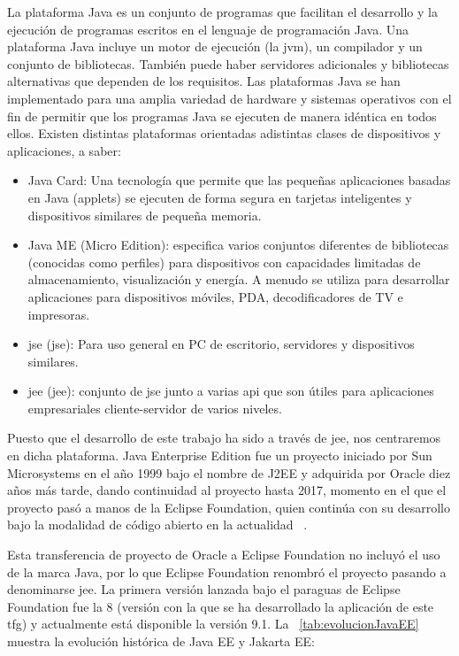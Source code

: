 La plataforma Java es un conjunto de programas que facilitan el desarrollo y la ejecución de programas escritos en el lenguaje de programación Java. Una plataforma Java incluye un motor de ejecución (la \acrshort{jvm}), un compilador y un conjunto de bibliotecas. También puede haber servidores adicionales y bibliotecas alternativas que dependen de los requisitos. Las plataformas Java se han implementado para una amplia variedad de hardware y sistemas operativos con el fin de permitir que los programas Java se ejecuten de manera idéntica en todos ellos. Existen distintas plataformas orientadas adistintas clases de dispositivos y aplicaciones, a saber:
\begin{itemize}
\item Java Card: Una tecnología que permite que las pequeñas aplicaciones basadas en Java (applets) se ejecuten de forma segura en tarjetas inteligentes y dispositivos similares de pequeña memoria. 
\item Java ME (Micro Edition): especifica varios conjuntos diferentes de bibliotecas (conocidas como perfiles) para dispositivos con capacidades limitadas de almacenamiento, visualización y energía. A menudo se utiliza para desarrollar aplicaciones para dispositivos móviles, PDA, decodificadores de TV e impresoras. 
\item \acrshort{jse} (\acrlong{jse}): Para uso general en PC de escritorio, servidores y dispositivos similares. 
\item \acrshort{jee} (\acrlong{jee}): conjunto de \acrshort{jse} junto a varias \acrfull{api} que son útiles para aplicaciones empresariales cliente-servidor de varios niveles.
\end{itemize}


Puesto que el desarrollo de este trabajo ha sido a través de \acrshort{jee}, nos centraremos en dicha plataforma. Java Enterprise Edition fue un proyecto iniciado por Sun Microsystems en el año 1999 bajo el nombre de J2EE y adquirida por Oracle diez años más tarde, dando continuidad al proyecto hasta 2017, momento en el que el proyecto pasó a manos de la Eclipse Foundation, quien continúa con su desarrollo bajo la modalidad de código abierto en la actualidad ~\cite{JakartaEE-eclipse}.

Esta transferencia de proyecto de Oracle a Eclipse Foundation no incluyó el uso de la marca Java, por lo que Eclipse Foundation renombró el proyecto pasando a denominarse \acrshort{jee}. La primera versión lanzada bajo el paraguas de Eclipse Foundation fue la 8 (versión con la que se ha desarrollado la aplicación de este \acrshort{tfg}) y actualmente está disponible la versión 9.1. La \tablename~\ref{tab:evolucionJavaEE} muestra la evolución histórica de Java EE y Jakarta EE:

